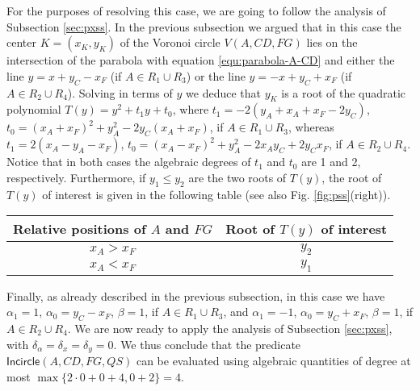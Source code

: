 \documentclass[letterpaper,11pt]{article}
\newcommand{\incircle}{\textsf{Incircle}\xspace}
\newcommand{\vor}{Voronoi\xspace}
\begin{document}
For the purposes of resolving this case, we are going to follow the
analysis of Subsection \ref{sec:pxss}. In the previous subsection
we argued that in this case the center $K=(x_K,y_K)$ of the \vor
circle $V(A,CD,FG)$ lies on the intersection of the parabola with
equation \eqref{equ:parabola-A-CD} and either the line $y=x+y_C-x_F$
(if $A\in{}R_1\cup{}R_3$) or the line $y=-x+y_C+x_F$ (if
$A\in{}R_2\cup{}R_4$). Solving in terms of $y$ we deduce that $y_K$ is
a root of the quadratic polynomial $T(y)=y^2+t_1y+t_0$, where
$t_1= -2 (y_A+x_A+x_F-2y_C)$,
$t_0= (x_A+x_F)^2 + y_A^2-2y_C(x_A+x_F)$,
if $A\in{}R_1\cup{}R_3$, whereas
$t_1= 2(x_A-y_A-x_F)$,
$t_0= (x_A-x_F)^2+ y_A^2-2x_Ay_C+2y_Cx_F$,
if $A\in{}R_2\cup{}R_4$.
Notice that in both cases the algebraic degrees of $t_1$ and $t_0$ are
1 and 2, respectively. Furthermore, if $y_1\le{}y_2$ are the two roots
of $T(y)$, the root of $T(y)$ of interest is given in the following
table (see also Fig. \ref{fig:pss}(right)).
\begin{center}
\begin{tabular}{|c|c|}
\hline
Relative positions of $A$ and $FG$ & Root of $ T(y) $ of interest\\
\hline \hline
$x_A>x_F$&$y_{2}$\\\hline
$x_A<x_F$&$y_{1}$\\\hline
\end{tabular}
\end{center}
Finally, as already 
described in the previous subsection, in this case we have $\alpha_1=1$,
$\alpha_0=y_C-x_F$, $\beta=1$, if $A\in{}R_1\cup{}R_3$, and
$\alpha_1=-1$, $\alpha_0=y_C+x_F$, $\beta=1$, if $A\in{}R_2\cup{}R_4$.
We are now ready to apply the analysis of Subsection \ref{sec:pxss},
with $\delta_\alpha=\delta_x=\delta_y=0$. We thus conclude that 
the predicate $\incircle(A,CD,FG,QS)$ can be evaluated using algebraic
quantities of degree at most $\max\{2\cdot{}0+0+4,0+2\}=4$.

\begin{comment}
\begin{table}[t]
\begin{center}
\begin{tabular}{|c|c|}
\hline
Relative positions of $A$ and $FG$ & Root of $ T(y) $ of interest\\
\hline \hline
$x_A>x_F$&$y_{2}$\\\hline
$x_A<x_F$&$y_{1}$\\\hline
\end{tabular}
\end{center}
\caption{Root of $P(y)$ that corresponds to $y_K$ as a function of the
  relative positions of $A$ and $FG$; here $CD$ is assumed $x$-axis
  parallel, while $FG$ is $y$-axis parallel.}
\label{Table:PSSSxy}
\end{table}
\end{comment}
\end{document}
